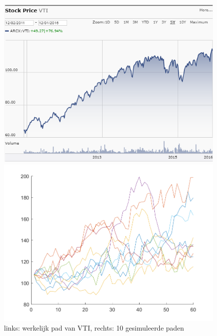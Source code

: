 \documentclass[11pt, a4paper, titlepage, openright]{article}
\begin{document}
		\begin{figure}[H]
			\begin{minipage}[b]{0.49\textwidth}
			\includegraphics[width=1.0\linewidth]{../ex4-actual}
			\end{minipage}
			\hfill
			\begin{minipage}[b]{0.49\textwidth}
			\includegraphics[width=1.0\linewidth]{../ex4-paths}
			\end{minipage}
			\caption{links: werkelijk pad van VTI, rechts: 10 gesimuleerde paden}
			\label{fig:vtiPath}
		\end{figure}

	\newpage
\end{document}
